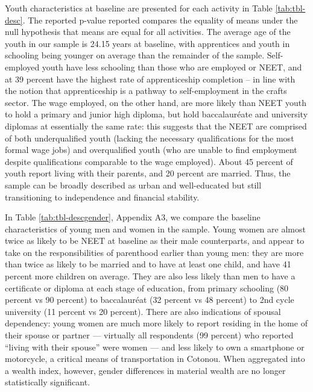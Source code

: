 \documentclass[
  a4paper, twoside, 12pt]{book}
\begin{document}
Youth characteristics at baseline are presented for each activity in Table \ref{tab:tbl-desc}. The reported p-value reported compares the equality of means under the null hypothesis that means are equal for all activities. The average age of the youth in our sample is 24.15 years at baseline, with apprentices and youth in schooling being younger on average than the remainder of the sample. Self-employed youth have less schooling than those who are employed or NEET, and at 39 percent have the highest rate of apprenticeship completion -- in line with the notion that apprenticeship is a pathway to self-employment in the crafts sector. The wage employed, on the other hand, are more likely than NEET youth to hold a primary and junior high diploma, but hold baccalauréate and university diplomas at essentially the same rate: this suggests that the NEET are comprised of both underqualified youth (lacking the necessary qualifications for the most formal wage jobs) and overqualified youth (who are unable to find employment despite qualifications comparable to the wage employed). About 45 percent of youth report living with their parents, and 20 percent are married. Thus, the sample can be broadly described as urban and well-educated but still transitioning to independence and financial stability.

In Table \ref{tab:tbl-descgender}, Appendix A3, we compare the baseline characteristics of young men and women in the sample. Young women are almost twice as likely to be NEET at baseline as their male counterparts, and appear to take on the responsibilities of parenthood earlier than young men: they are more than twice as likely to be married and to have at least one child, and have 41 percent more children on average. They are also less likely than men to have a certificate or diploma at each stage of education, from primary schooling (80 percent vs 90 percent) to baccalauréat (32 percent vs 48 percent) to 2nd cycle university (11 percent vs 20 percent). There are also indications of spousal dependency: young women are much more likely to report residing in the home of their spouse or partner --- virtually all respondents (99 percent) who reported ``living with their spouse'' were women --- and less likely to own a smartphone or motorcycle, a critical means of transportation in Cotonou. When aggregated into a wealth index, however, gender differences in material wealth are no longer statistically significant.
\end{document}
